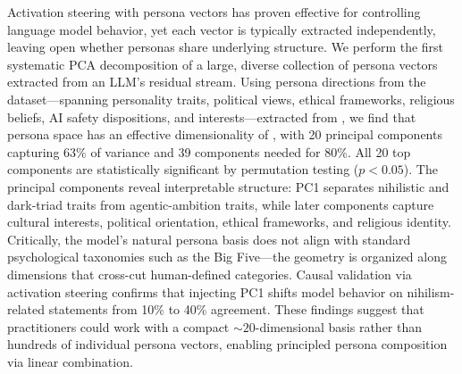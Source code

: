 Activation steering with persona vectors has proven effective for controlling language model behavior, yet each vector is typically extracted independently, leaving open whether personas share underlying structure.
We perform the first systematic PCA decomposition of a large, diverse collection of persona vectors extracted from an LLM's residual stream.
Using \npersonas persona directions from the \personaevals dataset---spanning personality traits, political views, ethical frameworks, religious beliefs, AI safety dispositions, and interests---extracted from \qwen, we find that persona space has an effective dimensionality of \effdim, with 20 principal components capturing 63\% of variance and 39 components needed for 80\%.
All 20 top components are statistically significant by permutation testing ($p < 0.05$).
The principal components reveal interpretable structure: PC1 separates nihilistic and dark-triad traits from agentic-ambition traits, while later components capture cultural interests, political orientation, ethical frameworks, and religious identity.
Critically, the model's natural persona basis does not align with standard psychological taxonomies such as the Big Five---the geometry is organized along dimensions that cross-cut human-defined categories.
Causal validation via activation steering confirms that injecting PC1 shifts model behavior on nihilism-related statements from 10\% to 40\% agreement.
These findings suggest that practitioners could work with a compact ${\sim}20$-dimensional basis rather than hundreds of individual persona vectors, enabling principled persona composition via linear combination.
